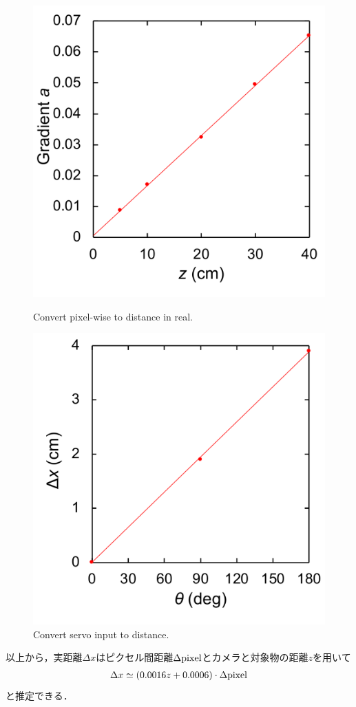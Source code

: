 \begin{figure}
\begin{minipage}{0.49\hsize}
        \includegraphics[width=\linewidth]{figure/chapter4/depth2gradient}
        \label{fig:depth2grad}
    \end{minipage}
    \caption{Convert pixel-wise to distance in real.}
    \label{fig:pix2distance}
\end{figure}

\begin{figure}
    \centering
    \includegraphics[width=0.5\linewidth]{figure/chapter4/servo2distance}
    \caption{Convert servo input to distance.}
    \label{fig:servo2dist}
\end{figure}

以上から，実距離$\Delta x$はピクセル間距離$\Delta \rm{pixel}$とカメラと対象物の距離$z$を用いて
\begin{align}\label{eq:ピクセル間距離}
\Delta x \simeq (0.0016z + 0.0006) \cdot \Delta \rm{pixel}
\end{align}
と推定できる．

